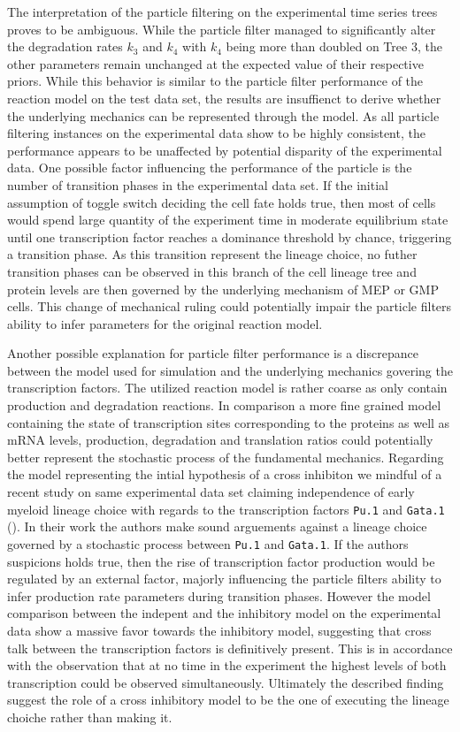\documentclass{bioinfo}
\begin{document}
The interpretation of the particle filtering on the experimental time series trees proves to be ambiguous. While the particle filter managed to significantly alter the degradation rates $k_3$ and $k_4$ with $k_4$ being more than doubled on Tree 3, the other parameters remain unchanged at the expected value of their respective priors. While this behavior is similar to the particle filter performance of the reaction model on the test data set, the results are insuffienct to derive whether	the underlying mechanics can be represented through the model. As all particle filtering instances on the experimental data show to be highly consistent, the performance appears to be unaffected by potential disparity of the experimental data. One possible factor influencing the performance of the particle is the number of transition phases in the experimental data set. If the initial assumption of toggle switch deciding the cell fate holds true, then most of cells would spend large quantity of the experiment time in moderate equilibrium state until one transcription factor reaches a dominance threshold by chance, triggering a transition phase. As this transition represent the lineage choice, no futher transition phases can be observed in this branch of the cell lineage tree and protein levels are then governed by the underlying mechanism of MEP or GMP cells. This change of mechanical ruling could potentially impair the particle filters ability to infer parameters for the original reaction model.


Another possible explanation for particle filter performance is a discrepance between the model used for simulation and the underlying mechanics govering the transcription factors. The utilized reaction model is rather coarse as only contain production and degradation reactions. In comparison a more fine grained model containing the state of transcription sites corresponding to the proteins as well as mRNA levels, production, degradation and translation ratios could potentially better represent the stochastic process of the fundamental mechanics. Regarding the model representing the intial hypothesis of a cross inhibiton we mindful of a recent study on same experimental data set claiming independence of early myeloid lineage choice with regards to the transcription factors \texttt{Pu.1} and \texttt{Gata.1} (\citealp{Hoppe16}). In their work the authors make sound arguements against a lineage choice governed by a stochastic process between \texttt{Pu.1} and \texttt{Gata.1}. If the authors suspicions holds true, then the rise of transcription factor production would be regulated by an external factor, majorly influencing the particle filters ability to infer production rate parameters during transition phases. However the model comparison between the indepent and the inhibitory model on the experimental data show a massive favor towards the inhibitory model, suggesting that cross talk between the transcription factors is definitively present. This is in accordance with the observation that at no time in the experiment the highest levels of both transcription could be observed simultaneously. Ultimately the described finding suggest the role of a cross inhibitory model to be the one of executing the lineage choiche rather than making it.
\end{document}
